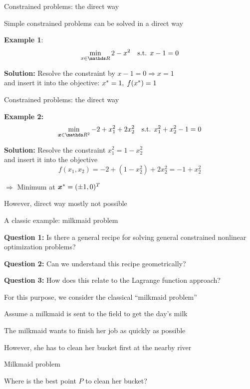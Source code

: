 \documentclass[11pt,compress,t,notes=noshow, xcolor=table]{beamer}
\begin{document}
\begin{framei}{Constrained problems: the direct way}
\item Simple constrained problems can be solved in a direct way
\item[] \textbf{Example 1}:
$$
\min_{x\in \R} 2 - x^2 \quad \text{s.t. } x - 1 = 0
$$
\item \textbf{Solution:} Resolve the constraint by $x - 1 = 0 \Rightarrow x = 1$\\
and insert it into the objective: $x^\ast = 1, \; f(x^\ast) = 1$
\end{framei}


\begin{framei}{Constrained problems: the direct way}
\item[] \textbf{Example 2:}
$$
\min_{\xv \in \R^2} - 2 + x_1^2 + 2 x_2^2 \quad \text{s.t. } x_1^2 + x_2^2 - 1 = 0
$$
\item \textbf{Solution:} Resolve the constraint $x_1^2 = 1 - x_2^2$\\
and insert it into the objective
$$
f(x_1, x_2) = -2 + (1 - x_2^2) + 2 x_2^2 = -1 + x_2^2
$$
\item $\Rightarrow$ Minimum at $\bm{x}^\ast = (\pm 1, 0)^T$
\item However, direct way mostly not possible
\end{framei}


\begin{framei}{A classic example: milkmaid problem}
\item \textbf{Question 1:} Is there a general recipe for solving general constrained nonlinear optimization problems?
\item \textbf{Question 2:} Can we understand this recipe geometrically?
\item \textbf{Question 3:} How does this relate to the Lagrange function approach?
\vfill
\item For this purpose, we consider the classical ``milkmaid problem''
\item Assume a milkmaid is sent to the field to get the day's milk
\item The milkmaid wants to finish her job as quickly as possible
\item However, she has to clean her bucket first at the nearby river
\end{framei}


\begin{framei}{Milkmaid problem}
\item Where is the best point $P$ to clean her bucket?
\vfill
{}
\end{framei}
\end{document}
